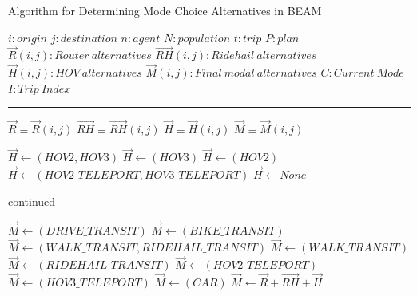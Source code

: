 \documentclass[fancy, masters]{byuthesis}
\begin{document}
\begin{algorithm} [tph]
\caption{Algorithm for Determining Mode Choice Alternatives in BEAM}
\begin{algorithmic}[1]
\Require
\State $i : origin$
\State $j : destination$
\State $n: agent$
\State $N: population$
\State $t : trip $
\State $P : plan$
\State $\vec{R}(i,j) : Router\: alternatives$
\State $\vec{RH}(i,j) : Ridehail\:alternatives$
\State $\vec{H}(i,j) : HOV\:alternatives$
\State $\vec{M}(i,j) : Final\:modal\:alternatives$
\State $C : Current\:Mode$
\State $I : Trip\:Index$
\vspace{4pt}\hrule\vspace{5pt}

\State $\vec{R} \equiv \vec{R}(i,j)$
\State $\vec{RH} \equiv \vec{RH}(i,j)$
\State $\vec{H} \equiv \vec{H}(i,j)$
\State $\vec{M} \equiv \vec{M}(i,j)$

    \State $\vec{H} \gets (HOV2,HOV3)$
    \State $\vec{H} \gets (HOV3)$
    \State $\vec{H} \gets (HOV2)$
    \State $\vec{H} \gets (HOV2\_TELEPORT, HOV3\_TELEPORT)$
  \EndIf
\Else
  \State $\vec{H} \gets None$
\EndIf
\EndProcedure
\Statex
{}
\end{algorithmic}
\end{algorithm}

\addtocounter{algorithm}{-1}
\begin{algorithm}
\caption{continued}
\begin{algorithmic} [1]
      \State $\vec{M} \gets (DRIVE\_TRANSIT)$
    \Else
      \State $\vec{M} \gets (BIKE\_TRANSIT)$
    \EndIf  
  \Else
    \State $\vec{M} \gets (WALK\_TRANSIT, RIDEHAIL\_TRANSIT)$
  \EndIf
{}  
    \State $\vec{M} \gets (WALK\_TRANSIT)$
  \Else
    \State $\vec{M} \gets (RIDEHAIL\_TRANSIT)$
  \EndIf
{}  
    \State $\vec{M} \gets (HOV2\_TELEPORT)$
  \Else
    \State $\vec{M} \gets (HOV3\_TELEPORT)$
  \EndIf
{}
  \State $\vec{M} \gets (CAR)$
\Else
  \State $\vec{M} \gets \vec{R} + \vec{RH} + \vec{H}$  
\EndIf  
\EndProcedure
\EndFor
\EndFor
\Statex
\end{algorithmic}
\end{algorithm}
\end{document}
